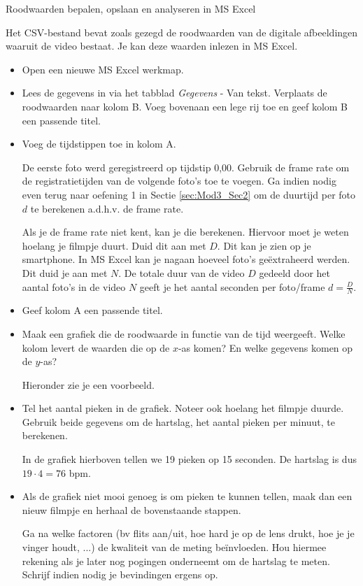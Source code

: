 \begin{opdracht}{Roodwaarden bepalen, opslaan en analyseren in MS Excel}
\begin{enumerate}
	Het CSV-bestand bevat zoals gezegd de roodwaarden van de digitale afbeeldingen waaruit de video bestaat. Je kan deze waarden inlezen in MS Excel. 
	
	\begin{itemize}
		\item Open een nieuwe MS Excel werkmap.
		\item Lees de gegevens in via het tabblad \emph{Gegevens} - Van tekst. Verplaats de roodwaarden naar kolom B. Voeg bovenaan een lege rij toe en geef kolom B een passende titel.
		\item Voeg de tijdstippen toe in kolom A. 
		
		De eerste foto werd geregistreerd op tijdstip 0,00. Gebruik de frame rate om de registratietijden van de volgende foto's toe te voegen. Ga indien nodig even terug naar oefening 1 in Sectie \ref{sec:Mod3_Sec2} om de duurtijd per foto $d$ te berekenen a.d.h.v. de frame rate.
		
		Als je de frame rate niet kent, kan je die berekenen. Hiervoor moet je weten hoelang je filmpje duurt. Duid dit aan met $D$. Dit kan je zien op je smartphone. In MS Excel kan je nagaan hoeveel foto's ge\"extraheerd werden. Dit duid je aan met $N$. De totale duur van de video $D$ gedeeld door het aantal foto's in de video $N$ geeft je het aantal seconden per foto/frame $d=\frac{D}{N}$. 
		
		\item Geef kolom A een passende titel.
		
		\item Maak een grafiek die de roodwaarde in functie van de tijd weergeeft. Welke kolom levert de waarden die op de $x$-as komen? En welke gegevens komen op de $y$-as?
		
		Hieronder zie je een voorbeeld.
		
		
		\item Tel het aantal pieken in de grafiek. Noteer ook hoelang het filmpje duurde. Gebruik beide gegevens om de hartslag, het aantal pieken per minuut, te berekenen.
		
		In de grafiek hierboven tellen we 19 pieken op 15 seconden. De hartslag is dus $19 \cdot 4 = 76$ bpm.
		
		\item Als de grafiek niet mooi genoeg is om pieken te kunnen tellen, maak dan een nieuw filmpje en herhaal de bovenstaande stappen. 
		
		Ga na welke factoren (bv flits aan/uit, hoe hard je op de lens drukt, hoe je je vinger houdt, ...) de kwaliteit van de meting be\"invloeden. Hou hiermee rekening als je later nog pogingen onderneemt om de hartslag te meten. Schrijf indien nodig je bevindingen ergens op.
	\end{itemize}	

\end{enumerate}
	
\end{opdracht}

